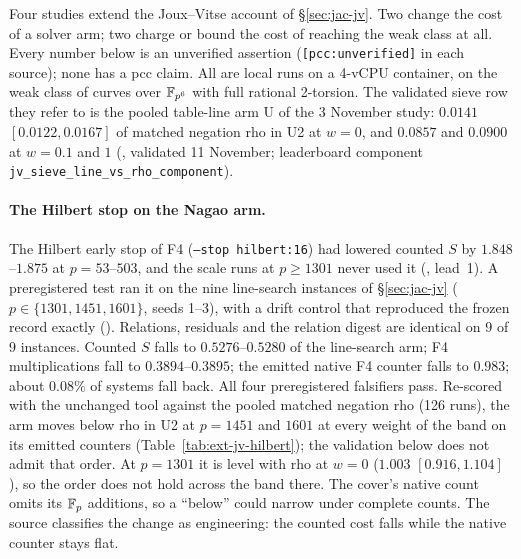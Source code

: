Four studies extend the Joux--Vitse account of \S\ref{sec:jac-jv}. Two
change the cost of a solver arm; two charge or bound the cost of reaching
the weak class at all. Every number below is an unverified assertion
(\texttt{[pcc:unverified]} in each source); none has a pcc claim. All are
local runs on a 4-vCPU container, on the weak class of curves over
$\mathbb{F}_{p^6}$ with full rational 2-torsion. The validated sieve row they
refer to is the pooled table-line arm U of the 3 November study:
$0.0141$ $[0.0122,0.0167]$ of matched negation rho in U2 at $w=0$, and
$0.0857$ and $0.0900$ at $w=0.1$ and $1$ (,
validated 11 November; leaderboard component
\texttt{jv\_sieve\_line\_vs\_rho\_component}).

\paragraph{The Hilbert stop on the Nagao arm.} The Hilbert early stop of F4
(\texttt{--stop hilbert:16}) had lowered counted $S$ by $1.848$--$1.875$ at
$p=53$--$503$, and the scale runs at $p\ge1301$ never used it
(, lead~1). A preregistered test ran
it on the nine line-search instances of \S\ref{sec:jac-jv}
($p\in\{1301,1451,1601\}$, seeds 1--3), with a drift control that
reproduced the frozen record exactly
(). Relations, residuals
and the relation digest are identical on 9 of 9 instances. Counted $S$
falls to $0.5276$--$0.5280$ of the line-search arm; F4 multiplications
fall to $0.3894$--$0.3895$; the emitted native F4 counter falls to
$0.983$; about $0.08\%$ of systems fall back. All four preregistered
falsifiers pass. Re-scored with the unchanged tool against the pooled
matched negation rho (126 runs), the arm moves below rho in U2 at
$p=1451$ and $1601$ at every weight of the band on its emitted counters
(Table~\ref{tab:ext-jv-hilbert}); the validation below does not admit that
order. At $p=1301$ it is level with rho at
$w=0$ ($1.003$ $[0.916,1.104]$), so the order does not hold across the
band there. The cover's native count omits its $\mathbb{F}_p$ additions, so a
``below'' could narrow under complete counts. The source classifies the
change as engineering: the counted cost falls while the native counter
stays flat.

